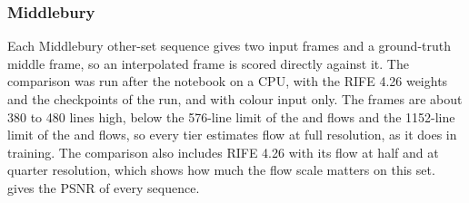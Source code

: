 \subsubsection{Middlebury}\label{sec:fgr-mb}

Each Middlebury other-set sequence gives two input frames and a ground-truth middle frame, so an interpolated frame is scored directly against it. The comparison was run after the notebook on a CPU, with the RIFE 4.26 weights and the checkpoints of the run, and with colour input only. The frames are about 380 to 480 lines high, below the 576-line limit of the  and  flows and the 1152-line limit of the  and  flows, so every tier estimates flow at full resolution, as it does in training. The comparison also includes RIFE 4.26 with its flow at half and at quarter resolution, which shows how much the flow scale matters on this set.  gives the PSNR of every sequence.

